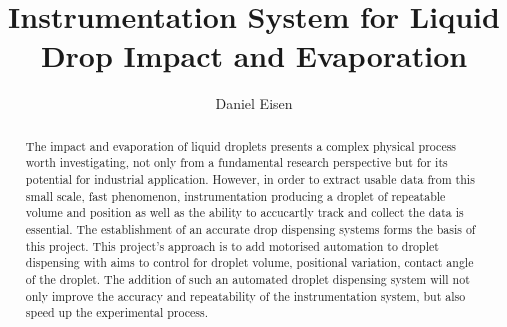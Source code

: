 \documentclass[11pt
              , a4paper
              , oneside
              ]{report}
\title{Instrumentation System for Liquid Drop Impact and Evaporation}
\author{Daniel Eisen}
\date{}
\begin{document}



\begin{abstract}
    
    The impact and evaporation of liquid droplets presents a complex physical process worth investigating, not only from a fundamental research perspective but for its potential for industrial application. However, in order to extract usable data from this small scale, fast phenomenon, instrumentation producing a droplet of repeatable volume and position as well as the ability to accucartly track and collect the data is essential. The establishment of an accurate drop dispensing systems forms the basis of this project. This project's approach is to add motorised automation to droplet dispensing with aims to control for droplet volume, positional variation, contact angle of the droplet.
    The addition of such an automated droplet dispensing system will not only improve the accuracy and repeatability of the instrumentation system, but also speed up the experimental process.

\end{abstract}


\maketitle
\tableofcontents


\mainmatter











\backmatter




\end{document}

